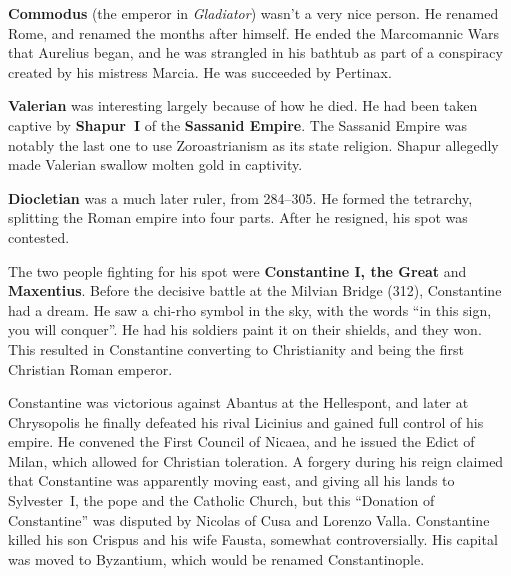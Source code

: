 \textbf{Commodus} (the emperor in \textit{Gladiator}) wasn't a very nice person.
He renamed Rome, and renamed the months after himself.
He ended the Marcomannic Wars that Aurelius began, and he was strangled in his bathtub
as part of a conspiracy created by his mistress Marcia.
He was succeeded by Pertinax.

\textbf{Valerian} was interesting largely because of how he died.
He had been taken captive by \textbf{Shapur~I} of the \textbf{Sassanid Empire}.
The Sassanid Empire was notably the last one to use Zoroastrianism as its state religion.
Shapur allegedly made Valerian swallow molten gold in captivity.

\textbf{Diocletian} was a much later ruler, from 284--305.
He formed the tetrarchy, splitting the Roman empire into four parts.
After he resigned, his spot was contested.

The two people fighting for his spot were \textbf{Constantine I, the Great} and \textbf{Maxentius}.
Before the decisive battle at the Milvian Bridge (312), Constantine had a dream.
He saw a chi-rho symbol in the sky, with the words ``in this sign, you will conquer''.
He had his soldiers paint it on their shields, and they won.
This resulted in Constantine converting to Christianity and being the first Christian Roman emperor.

Constantine was victorious against Abantus at the Hellespont,
and later at Chrysopolis he finally defeated his rival Licinius and gained full control of his empire.
He convened the First Council of Nicaea, and he issued the Edict of Milan,
which allowed for Christian toleration.
A forgery during his reign claimed that Constantine was apparently moving east,
and giving all his lands to Sylvester~I, the pope and the Catholic Church,
but this ``Donation of Constantine'' was disputed by Nicolas of Cusa and Lorenzo Valla.
Constantine killed his son Crispus and his wife Fausta, somewhat controversially.
His capital was moved to Byzantium, which would be renamed Constantinople.
